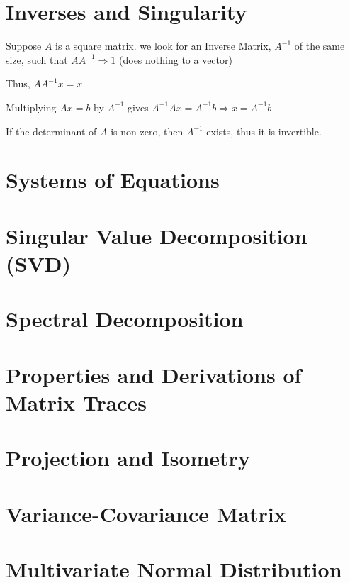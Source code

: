 \documentclass{article}
\theoremstyle{definition}
\theoremstyle{remark}
\begin{document}
\section{Inverses and Singularity}

Suppose $A$ is a square matrix. we look for an Inverse Matrix, $A^{-1}$ of the same size, such that $AA^{-1} \Rightarrow 1$ (does nothing to a vector) 

Thus, $AA^{-1}x = x$

Multiplying $Ax = b$ by $A^{-1}$ gives $A^{-1}Ax = A^{-1}b \Rightarrow x = A^{-1}b$

If the determinant of $A$ is non-zero, then $A^{-1}$ exists, thus it is invertible. 

\section{Systems of Equations}

\section{Singular Value Decomposition (SVD)}

\section{Spectral Decomposition}

\section{Properties and Derivations of Matrix Traces}

\section{Projection and Isometry}

\section{Variance-Covariance Matrix}

\section{Multivariate Normal Distribution}
\end{document}
